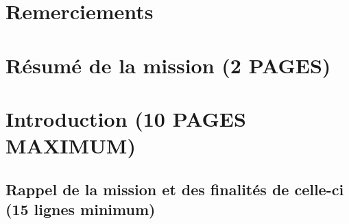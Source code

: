 \documentclass[a4paper, 12pt]{article}
\begin{document}
\onehalfspacing %

\renewcommand{\listfigurename}{Table des illustrations}
\renewcommand{\figurename}{Illustration}
\renewcommand{\tablename}{Tableau}
\renewcommand{\contentsname}{Sommaire}

\maketitle
\thispagestyle{empty}
\newpage{}


\tableofcontents
\thispagestyle{empty}
\newpage{}

\setcounter{page}{1}

\section{Remerciements}

    
    \newpage{}

\section{Résumé de la mission (2 PAGES)}

    
    \newpage{}

\section{Introduction (10 PAGES MAXIMUM)}


\subsection{Rappel de la mission et des finalités de celle-ci (15 lignes minimum)}

    
    \newpage{}

\end{document}
